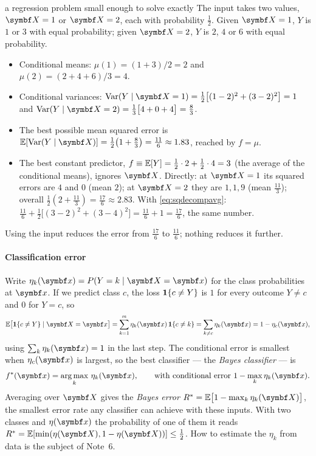 \documentclass[11pt]{article}
\begin{document}
\begin{worked}{a regression problem small enough to solve exactly}
The input takes two values, $\X = 1$ or $\X = 2$, each with probability $\tfrac12$. Given $\X = 1$, $Y$ is $1$ or $3$
with equal probability; given $\X = 2$, $Y$ is $2$, $4$ or $6$ with equal probability.
\begin{itemize}
\item Conditional means: $\mu(1) = (1 + 3)/2 = 2$ and $\mu(2) = (2 + 4 + 6)/3 = 4$.
\item Conditional variances: $\Var(Y \mid \X = 1) = \tfrac12\big[(1-2)^2 + (3-2)^2\big] = 1$ and
$\Var(Y \mid \X = 2) = \tfrac13\big[4 + 0 + 4\big] = \tfrac83$.
\item The best possible mean squared error is $\E[\Var(Y \mid \X)] = \tfrac12\big(1 + \tfrac83\big) = \tfrac{11}{6}
\approx 1.83$, reached by $f = \mu$.
\item The best constant predictor, $f \equiv \mathbb{E}[Y] = \tfrac12 \cdot 2 + \tfrac12 \cdot 4 = 3$ (the average of the
conditional means), ignores $\X$. Directly: at $\X = 1$ its squared errors are $4$ and $0$
(mean $2$); at $\X = 2$ they are $1, 1, 9$ (mean $\tfrac{11}{3}$); overall $\tfrac12(2 + \tfrac{11}{3}) =
\tfrac{17}{6} \approx 2.83$. With \eqref{eq:sqdecompavg}: $\tfrac{11}{6} + \tfrac12\big[(3-2)^2 + (3-4)^2\big] =
\tfrac{11}{6} + 1 = \tfrac{17}{6}$, the same number.
\end{itemize}
Using the input reduces the error from $\tfrac{17}{6}$ to $\tfrac{11}{6}$; nothing reduces it further.
\end{worked}

\paragraph{Classification error} Write $\eta_k(\x) = P(Y = k \mid \X = \x)$ for the class probabilities at $\x$. If we
predict class $c$, the loss $\mathbf{1}\!\left\{c \ne Y\right\}$ is $1$ for every outcome $Y \ne c$ and $0$ for $Y = c$, so
\[
  \E\big[\ind{c \ne Y} \mid \X = \x\big] = \sum_{k=1}^m \eta_k(\x)\, \ind{c \ne k} = \sum_{k \ne c} \eta_k(\x)
  = 1 - \eta_c(\x),
\]
using $\sum_k \eta_k(\x) = 1$ in the last step. The conditional error is smallest when $\eta_c(\x)$ is largest, so the
best classifier --- the \emph{Bayes classifier} --- is
\begin{equation}\label{eq:bayesrule}
  f^*(\x) = \argmax_k\, \eta_k(\x), \qquad \text{with conditional error } 1 - \max_k \eta_k(\x) .
\end{equation}
Averaging over $\X$ gives the \emph{Bayes error} $R^* = \E\big[1 - \max_k \eta_k(\X)\big]$, the smallest error rate
any classifier can achieve with these inputs. With two classes and $\eta(\x)$ the probability of one of them it reads
$R^* = \E[\min(\eta(\X), 1 - \eta(\X))] \le \tfrac12$. How to estimate the $\eta_k$ from data is the subject of Note~6.
\end{document}
